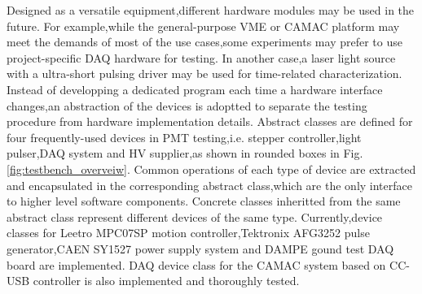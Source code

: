 \documentclass[preprint,5p,times]{elsarticle}
\begin{document}
Designed as a versatile equipment,different hardware modules may be used in the future.
For example,while the general-purpose VME or CAMAC platform may meet the demands of most of the use cases,some experiments may prefer to use project-specific DAQ hardware for testing.
In another case,a laser light source with a ultra-short pulsing driver may be used for time-related characterization.
Instead of developping a dedicated program each time a hardware interface changes,an abstraction of the devices is adoptted to separate the testing procedure from hardware implementation details.
Abstract classes are defined for four frequently-used devices in PMT testing,i.e. stepper controller,light pulser,DAQ system and HV supplier,as shown in rounded boxes in Fig.\ref{fig:testbench_overveiw}.
Common operations of each type of device are extracted and encapsulated in the corresponding abstract class,which are the only interface to higher level software components.
Concrete classes inheritted from the same abstract class represent different devices of the same type.
Currently,device classes for Leetro MPC07SP motion controller,Tektronix AFG3252 pulse generator,CAEN SY1527 power supply system and DAMPE gound test DAQ board are implemented.
DAQ device class for the CAMAC system based on CC-USB controller is also implemented and thoroughly tested.
\end{document}
